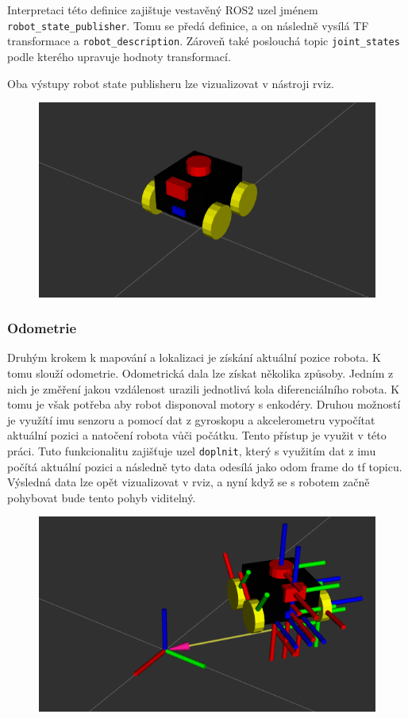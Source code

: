 Interpretaci této definice zajištuje vestavěný ROS2 uzel jménem \verb|robot_state_publisher|. Tomu se předá definice, a on následně vysílá TF transformace a \verb|robot_description|. Zároveň také poslouchá topic \verb|joint_states| podle kterého upravuje hodnoty transformací.

Oba výstupy robot state publisheru lze vizualizovat v nástroji rviz. %

\begin{figure}[h!]
	\centering
	\includegraphics[scale=0.5]{obrazky-figures/robot_description.png}
	\caption{}
	\label{}
\end{figure}

\subsubsection*{Odometrie}
Druhým krokem k mapování a lokalizaci je získání aktuální pozice robota. K tomu slouží odometrie. Odometrická dala lze získat několika způsoby. Jedním z nich je změření jakou vzdálenost urazili jednotlivá kola diferenciálního robota. K tomu je však potřeba aby robot disponoval motory s enkodéry. Druhou možností je využítí imu senzoru a pomocí dat z gyroskopu a akcelerometru vypočítat aktuální pozici a natočení robota vůči počátku. Tento přístup je využit v této práci. Tuto funkcionalitu zajišťuje uzel \verb|doplnit|, který s využitím dat z imu počítá aktuální pozici a následně tyto data odesílá jako odom frame do tf topicu. Výsledná data lze opět vizualizovat v rviz, a nyní když se s robotem začně pohybovat bude tento pohyb viditelný.

\begin{figure}[h!]
	\centering
	\includegraphics[scale=0.5]{obrazky-figures/odom.png}
	\caption{}
	\label{}
\end{figure}

